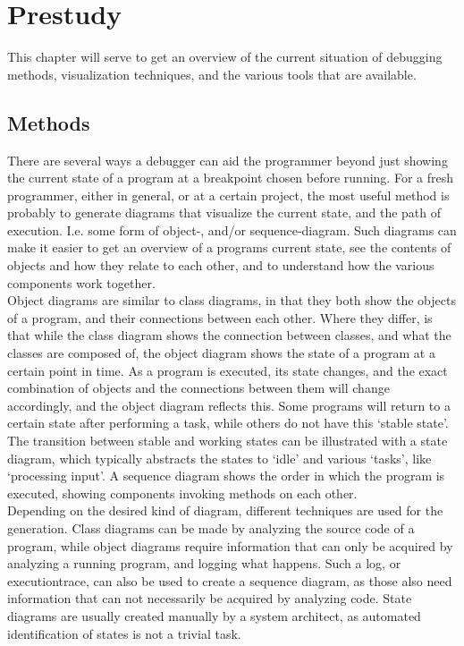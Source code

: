 \chapter{Prestudy}\label{prestudy}%
This chapter will serve to get an overview of the current situation of debugging methods, visualization techniques, and the various tools that are available.
\section{Methods}\label{preMethods}
There are several ways a debugger can aid the programmer beyond just showing the current state of a program at a \gls{breakpoint} chosen before running.
For a fresh programmer, either in general, or at a certain project, the most useful method is probably to generate diagrams that visualize the current state, and the path of execution.
I.e. some form of object-, and/or sequence-diagram.
Such diagrams can make it easier to get an overview of a programs current state, see the contents of objects and how they relate to each other, and to understand how the various components work together.
~\\

Object diagrams are similar to class diagrams, in that they both show the objects of a program, and their connections between each other.
Where they differ, is that while the class diagram shows the connection between classes, and what the classes are composed of, the object diagram shows the state of a program at a certain point in time.
As a program is executed, its state changes, and the exact combination of objects and the connections between them will change accordingly, and the object diagram reflects this.
Some programs will return to a certain state after performing a task, while others do not have this `stable state'.
The transition between stable and working states can be illustrated with a state diagram, which typically abstracts the states to `idle' and various `tasks', like `processing input'.
A sequence diagram shows the order in which the program is executed, showing components invoking methods on each other.
~\\

Depending on the desired kind of diagram, different techniques are used for the generation.
Class diagrams can be made by analyzing the source code of a program, while object diagrams require information that can only be acquired by analyzing a running program, and logging what happens.
Such a log, or \gls{executiontrace}, can also be used to create a sequence diagram, as those also need information that can not necessarily be acquired by analyzing code.
State diagrams are usually created manually by a system architect, as automated identification of states is not a trivial task.
~\\

